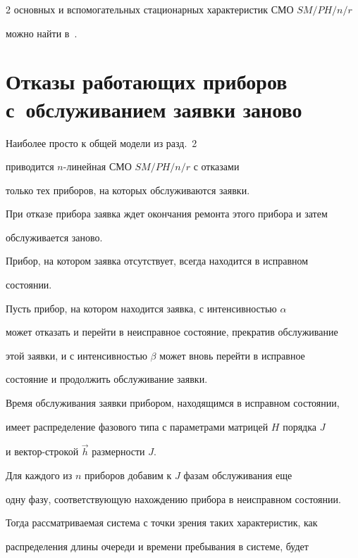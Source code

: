 \begin{multicols}{2}
основных и вспомогательных стационарных характеристик СМО $SM/PH/n/r$


можно найти в~\cite{PCh03}.





\section{Отказы работающих приборов с~обслуживанием заявки заново}





Наиболее просто к общей модели из разд.~2


приводится $n$-линейная СМО $SM/PH/n/r$ с отказами


только тех приборов, на которых обслуживаются заявки.


При отказе прибора заявка ждет окончания ремонта этого прибора и затем


обслуживается заново.


Прибор, на котором заявка отсутствует, всегда находится в исправном


состоянии.





Пусть прибор, на котором находится заявка, с интенсивностью $\alpha$


может отказать и перейти в неисправное состояние, прекратив обслуживание


этой заявки, и с интенсивностью $\beta$ может вновь перейти в исправное


состояние и продолжить обслуживание заявки.





Время обслуживания заявки прибором, находящимся в исправном состоянии,


имеет распределение фазового типа с параметрами матрицей $H$ порядка $J$


и вектор-строкой $\vec h$ размерности $J$.





Для каждого из $n$ приборов добавим к $J$ фазам обслуживания еще


одну фазу, со\-от\-вет\-ст\-ву\-ющую нахождению прибора в неисправном состоянии.


Тогда рассматриваемая система с точки зрения таких характеристик, как


распределения длины очереди и времени пребывания в системе, будет



\end{multicols}
